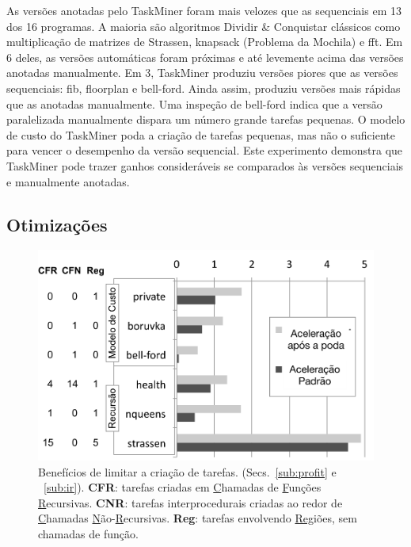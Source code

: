 \documentclass[sigplan,10pt,review]{acmart}
\newcommand\Taskminer{\mbox{\textsf{TaskMiner}}}
\begin{document}
As versões anotadas pelo \Taskminer{} foram mais velozes que as sequenciais em 13 dos 16 programas.
A maioria são algoritmos Dividir \& Conquistar clássicos como multiplicação de matrizes de \textsf{Strassen},
 \textsf{knapsack} (Problema da Mochila) e \textsf{fft}. Em 6 deles, as versões automáticas foram próximas e até
levemente acima das versões anotadas manualmente. Em 3, \Taskminer{} produziu versões piores que
as versões sequenciais: \textsf{fib}, \textsf{floorplan} e \textsf{bell-ford}. Ainda assim, produziu versões
mais rápidas que as anotadas manualmente. Uma inspeção de \textsf{bell-ford} indica que a versão
paralelizada manualmente dispara um número grande tarefas pequenas. O modelo de custo
do \Taskminer{} poda a criação de tarefas pequenas, mas não o suficiente para vencer o desempenho
da versão sequencial. Este experimento demonstra que \Taskminer{} pode trazer
ganhos consideráveis se comparados às versões sequenciais e manualmente anotadas.

\subsection{Otimizações}
\label{sub:optimizations}

\begin{figure}[b!]
\begin{center}
\includegraphics[width=1\columnwidth]{images/Optimizations}
\caption{Benefícios de limitar a criação de tarefas. (Secs.~\ref{sub:profit} e ~\ref{sub:ir}).
\textbf{CFR}: tarefas criadas em \underline{C}hamadas de \underline{F}unções \underline{R}ecursivas.
\textbf{CNR}: tarefas interprocedurais criadas ao redor de \underline{C}hamadas  \underline{N}ão-\underline{R}ecursivas.
\textbf{Reg}: tarefas envolvendo \underline{Reg}iões, sem chamadas de função.}
\label{fig:Optimizations}
\end{center}
\end{figure}
\end{document}
